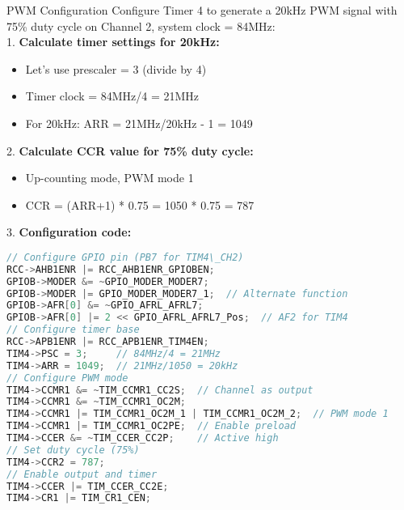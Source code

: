 \begin{example2}{PWM Configuration}
Configure Timer 4 to generate a 20kHz PWM signal with 75\% duty cycle on Channel 2, system clock = 84MHz:\\
1. \textbf{Calculate timer settings for 20kHz:}
\begin{itemize}
    \item Let's use prescaler = 3 (divide by 4)
    \item Timer clock = 84MHz/4 = 21MHz
    \item For 20kHz: ARR = 21MHz/20kHz - 1 = 1049
\end{itemize}
2. \textbf{Calculate CCR value for 75\% duty cycle:}
\begin{itemize}
    \item Up-counting mode, PWM mode 1
    \item CCR = (ARR+1) * 0.75 = 1050 * 0.75 = 787
\end{itemize}
3. \textbf{Configuration code:}
\begin{lstlisting}[language=C, style=basesmol]
// Configure GPIO pin (PB7 for TIM4\_CH2)
RCC->AHB1ENR |= RCC_AHB1ENR_GPIOBEN;
GPIOB->MODER &= ~GPIO_MODER_MODER7;
GPIOB->MODER |= GPIO_MODER_MODER7_1;  // Alternate function
GPIOB->AFR[0] &= ~GPIO_AFRL_AFRL7;
GPIOB->AFR[0] |= 2 << GPIO_AFRL_AFRL7_Pos;  // AF2 for TIM4
// Configure timer base
RCC->APB1ENR |= RCC_APB1ENR_TIM4EN;
TIM4->PSC = 3;     // 84MHz/4 = 21MHz
TIM4->ARR = 1049;  // 21MHz/1050 = 20kHz
// Configure PWM mode
TIM4->CCMR1 &= ~TIM_CCMR1_CC2S;  // Channel as output
TIM4->CCMR1 &= ~TIM_CCMR1_OC2M;
TIM4->CCMR1 |= TIM_CCMR1_OC2M_1 | TIM_CCMR1_OC2M_2;  // PWM mode 1
TIM4->CCMR1 |= TIM_CCMR1_OC2PE;  // Enable preload
TIM4->CCER &= ~TIM_CCER_CC2P;    // Active high
// Set duty cycle (75%)
TIM4->CCR2 = 787;
// Enable output and timer
TIM4->CCER |= TIM_CCER_CC2E;
TIM4->CR1 |= TIM_CR1_CEN;
\end{lstlisting}
\end{example2}








